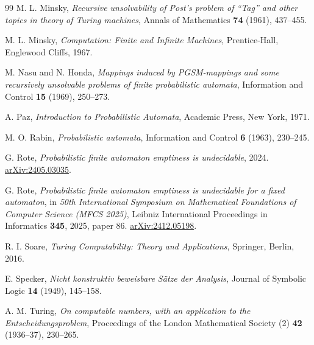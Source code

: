 \documentclass[11pt]{article}
\theoremstyle{plain}
\theoremstyle{definition}
\theoremstyle{remark}
\begin{document}
\begin{thebibliography}{99}
M. L. Minsky, \emph{Recursive unsolvability of Post's problem of ``Tag'' and other topics in theory of Turing machines}, Annals of Mathematics \textbf{74} (1961), 437--455.

M. L. Minsky, \emph{Computation: Finite and Infinite Machines}, Prentice-Hall, Englewood Cliffs, 1967.

M. Nasu and N. Honda, \emph{Mappings induced by PGSM-mappings and some recursively unsolvable problems of finite probabilistic automata}, Information and Control \textbf{15} (1969), 250--273.

A. Paz, \emph{Introduction to Probabilistic Automata}, Academic Press, New York, 1971.

M. O. Rabin, \emph{Probabilistic automata}, Information and Control \textbf{6} (1963), 230--245.

G. Rote, \emph{Probabilistic finite automaton emptiness is undecidable}, 2024.
\href{https://arxiv.org/abs/2405.03035}{arXiv:2405.03035}.

G. Rote, \emph{Probabilistic finite automaton emptiness is undecidable for a fixed automaton}, in \emph{50th International Symposium on Mathematical Foundations of Computer Science (MFCS 2025)}, Leibniz International Proceedings in Informatics \textbf{345}, 2025, paper 86.
\href{https://arxiv.org/abs/2412.05198}{arXiv:2412.05198}.

R. I. Soare, \emph{Turing Computability: Theory and Applications}, Springer, Berlin, 2016.

E. Specker, \emph{Nicht konstruktiv beweisbare S\"atze der Analysis}, Journal of Symbolic Logic \textbf{14} (1949), 145--158.

A. M. Turing, \emph{On computable numbers, with an application to the Entscheidungsproblem}, Proceedings of the London Mathematical Society (2) \textbf{42} (1936--37), 230--265.
\end{thebibliography}
\end{document}
